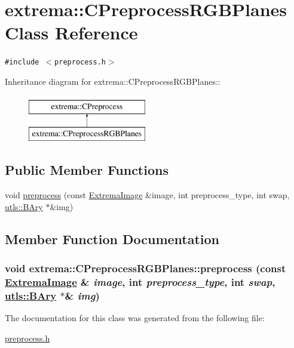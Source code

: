\hypertarget{classextrema_1_1CPreprocessRGBPlanes}{
\section{extrema::CPreprocess\-RGBPlanes Class Reference}
\label{classextrema_1_1CPreprocessRGBPlanes}
}
{\tt \#include $<$preprocess.h$>$}

Inheritance diagram for extrema::CPreprocess\-RGBPlanes::\begin{figure}[H]
\begin{center}
\leavevmode
\includegraphics[height=2cm]{classextrema_1_1CPreprocessRGBPlanes}
\end{center}
\end{figure}
\subsection*{Public Member Functions}
\begin{CompactItemize}
\item 
void \hyperlink{classextrema_1_1CPreprocessRGBPlanes_6530d8ee9ae4226458f330f73ca06a9d}{preprocess} (const \hyperlink{structextrema_1_1ExtremaImage}{Extrema\-Image} \&image, int preprocess\_\-type, int swap, \hyperlink{structutls_1_1Ary}{utls::BAry} $\ast$\&img)
\end{CompactItemize}


\subsection{Member Function Documentation}
\hypertarget{classextrema_1_1CPreprocessRGBPlanes_6530d8ee9ae4226458f330f73ca06a9d}{
\subsubsection[preprocess]{\setlength{\rightskip}{0pt plus 5cm}void extrema::CPreprocess\-RGBPlanes::preprocess (const \hyperlink{structextrema_1_1ExtremaImage}{Extrema\-Image} \& {\em image}, int {\em preprocess\_\-type}, int {\em swap}, \hyperlink{structutls_1_1Ary}{utls::BAry} $\ast$\& {\em img})}}
\label{classextrema_1_1CPreprocessRGBPlanes_6530d8ee9ae4226458f330f73ca06a9d}




The documentation for this class was generated from the following file:\begin{CompactItemize}
\item 
\hyperlink{preprocess_8h}{preprocess.h}\end{CompactItemize}
